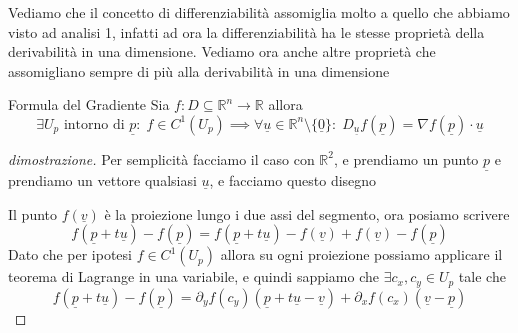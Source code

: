 \documentclass{rapport}
\begin{document}
Vediamo che il concetto di differenziabilità assomiglia molto a quello che abbiamo visto ad analisi 1, infatti ad ora la differenziabilità ha le stesse proprietà della derivabilità in una dimensione. Vediamo ora anche altre proprietà che assomigliano sempre di più alla derivabilità in una dimensione

\begin{teorema}{Formula del Gradiente}{}
 Sia $f: D \subseteq \mathbb{R}^n \to \mathbb{R}$ allora 
\[
  \exists U_p \text{ intorno di } \underline{p}: \; f \in C^1(U_p) \implies \forall \underline{u} \in \mathbb{R}^n \setminus \{\underline{0}\}: \; D_{\underline{u}} f(\underline{p}) = \nabla f(\underline{p}) \cdot \underline{u} 
\]
\end{teorema}

\begin{proof}[dimostrazione]
  Per semplicità facciamo il caso con $\mathbb{R}^2$, e prendiamo un punto $\underline{p}$ e prendiamo un vettore qualsiasi $\underline{u}$, e facciamo questo disegno 

  \begin{center}
\end{center}

Il punto $f(\underline{v})$ è la proiezione lungo i due assi del segmento, ora posiamo scrivere 
\[
f(\underline{p} + t\underline{u}) - f(\underline{p}) = f(\underline{p} + t\underline{u})  - f(\underline{v}) + f(\underline{v}) - f(\underline{p}) 
\]
\newpage
Dato che per ipotesi $f \in C^1(U_p)$ allora su ogni proiezione possiamo applicare il teorema di Lagrange in una variabile, e quindi sappiamo che $\exists c_x, c_y \in U_p$ tale che 
\[
f(\underline{p} + t\underline{u}) - f(\underline{p}) = \partial_y f (c_y) (\underline{p}+ t\underline{u} - \underline{v}) + \partial_x f(c_x) (\underline{v} - \underline{p})
\]


\end{proof}
\end{document}
